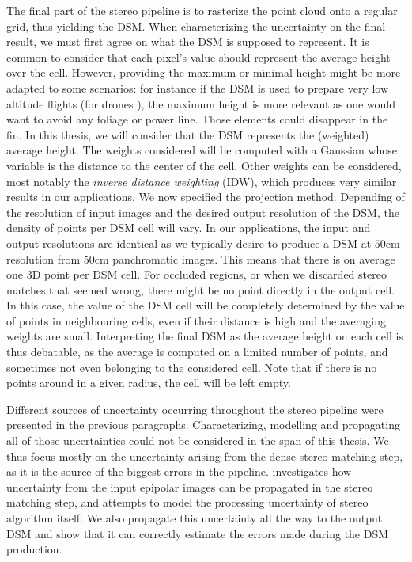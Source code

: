 The final part of the stereo pipeline is to rasterize the point cloud onto a regular grid, thus yielding the DSM. When characterizing the uncertainty on the final result, we must first agree on what the DSM is supposed to represent. It is common to consider that each pixel's value should represent the average height over the cell. However, providing the maximum or minimal height might be more adapted to some scenarios: for instance if the DSM is used to prepare very low altitude flights (for drones \etc), the maximum height is more relevant as one would want to avoid any foliage or power line. Those elements could disappear in the fin. In this thesis, we will consider that the DSM represents the (weighted) average height. The weights considered will be computed with a Gaussian whose variable is the distance to the center of the cell. Other weights can be considered, most notably the \textit{inverse distance weighting} (IDW), which produces very similar results in our applications. We now specified the projection method. Depending of the resolution of input images and the desired output resolution of the DSM, the density of points per DSM cell will vary. In our applications, the input and output resolutions are identical as we typically desire to produce a DSM at $50$cm resolution from $50$cm panchromatic images. This means that there is on average one 3D point per DSM cell. For occluded regions, or when we discarded stereo matches that seemed wrong, there might be no point directly in the output cell. In this case, the value of the DSM cell will be completely determined by the value of points in neighbouring cells, even if their distance is high and the averaging weights are small. Interpreting the final DSM as the average height on each cell is thus debatable, as the average is computed on a limited number of points, and sometimes not even belonging to the considered cell.  Note that if there is no points around in a given radius, the cell will be left empty. 

Different sources of uncertainty occurring throughout the stereo pipeline were presented in the previous paragraphs. Characterizing, modelling and propagating all of those uncertainties could not be considered in the span of this thesis. We thus focus mostly on the uncertainty arising from the dense stereo matching step, as it is the source of the biggest errors in the pipeline.  investigates how uncertainty from the input epipolar images can be propagated in the stereo matching step, and  attempts to model the processing uncertainty of stereo algorithm itself. We also propagate this uncertainty all the way to the output DSM and show that it can correctly estimate the errors made during the DSM production. 

